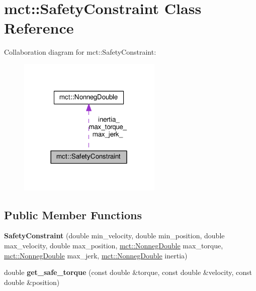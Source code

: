 \hypertarget{classmct_1_1SafetyConstraint}{}\section{mct\+:\+:Safety\+Constraint Class Reference}
\label{classmct_1_1SafetyConstraint}


Collaboration diagram for mct\+:\+:Safety\+Constraint\+:
\nopagebreak
\begin{figure}[H]
\begin{center}
\leavevmode
\includegraphics[width=194pt]{classmct_1_1SafetyConstraint__coll__graph}
\end{center}
\end{figure}
\subsection*{Public Member Functions}
\begin{DoxyCompactItemize}
\item 
{\bfseries Safety\+Constraint} (double min\+\_\+velocity, double min\+\_\+position, double max\+\_\+velocity, double max\+\_\+position, \hyperlink{classmct_1_1NonnegDouble}{mct\+::\+Nonneg\+Double} max\+\_\+torque, \hyperlink{classmct_1_1NonnegDouble}{mct\+::\+Nonneg\+Double} max\+\_\+jerk, \hyperlink{classmct_1_1NonnegDouble}{mct\+::\+Nonneg\+Double} inertia)\hypertarget{classmct_1_1SafetyConstraint_aaeed0e02691c4764e3a4934b8b42b69e}{}\label{classmct_1_1SafetyConstraint_aaeed0e02691c4764e3a4934b8b42b69e}

\item 
double {\bfseries get\+\_\+safe\+\_\+torque} (const double \&torque, const double \&velocity, const double \&position)\hypertarget{classmct_1_1SafetyConstraint_a8fbdcc71a00669057a8a957db41eea1e}{}\label{classmct_1_1SafetyConstraint_a8fbdcc71a00669057a8a957db41eea1e}

\end{DoxyCompactItemize}
